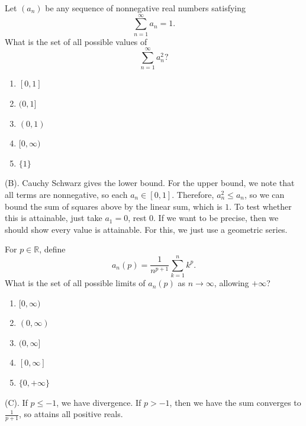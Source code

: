 \begin{exercise}
Let $(a_n)$ be any sequence of nonnegative real numbers satisfying
\[
\sum_{n=1}^{\infty}a_n=1.
\]
What is the set of all possible values of
\[
\sum_{n=1}^{\infty}a_n^2?
\]
\begin{enumerate}[label=(\Alph*)]
    \item $[0,1]$
    \item $(0,1]$
    \item $(0,1)$
    \item $[0,\infty)$
    \item $\{1\}$
\end{enumerate}
\end{exercise}
\begin{solution}
(B). Cauchy Schwarz gives the lower bound. For the upper bound, we note that all terms are nonnegative,
so each $a_n \in [0,1]$. Therefore, $a_n^2 \leq a_n$, so we can bound the sum of squares above 
by the linear sum, which is $1$. To test whether this is attainable, just take $a_1 = 0$, rest $0$.
If we want to be precise, then we should show every value is attainable. For this, we just use a geometric series.
\end{solution}

\begin{exercise}
For $p\in\mathbb R$, define
\[
a_n(p)=\frac{1}{n^{p+1}}\sum_{k=1}^n k^p.
\]
What is the set of all possible limits of $a_n(p)$
as $n\to\infty$, allowing $+\infty$?

\begin{enumerate}[label=(\Alph*)]
    \item $[0,\infty)$
    \item $(0,\infty)$
    \item $(0,\infty]$
    \item $[0,\infty]$
    \item $\{0,+\infty\}$
\end{enumerate}
\end{exercise}
\begin{solution}
(C). If $p \leq - 1$, we have divergence. If $p > -1$, then we have the sum converges to 
$\frac{1}{p + 1}$, so attains all positive reals.
\end{solution}

